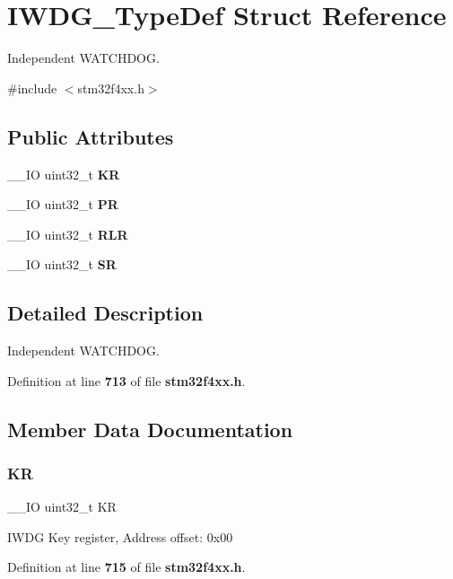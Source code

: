 \section{I\+W\+D\+G\+\_\+\+Type\+Def Struct Reference}
\label{structIWDG__TypeDef}


Independent W\+A\+T\+C\+H\+D\+OG.  




{\ttfamily \#include $<$stm32f4xx.\+h$>$}

\subsection*{Public Attributes}
\begin{DoxyCompactItemize}
\item 
\+\_\+\+\_\+\+IO uint32\+\_\+t \textbf{ KR}
\item 
\+\_\+\+\_\+\+IO uint32\+\_\+t \textbf{ PR}
\item 
\+\_\+\+\_\+\+IO uint32\+\_\+t \textbf{ R\+LR}
\item 
\+\_\+\+\_\+\+IO uint32\+\_\+t \textbf{ SR}
\end{DoxyCompactItemize}


\subsection{Detailed Description}
Independent W\+A\+T\+C\+H\+D\+OG. 

Definition at line \textbf{ 713} of file \textbf{ stm32f4xx.\+h}.



\subsection{Member Data Documentation}
\mbox{\label{structIWDG__TypeDef_a2f692354bde770f2a5e3e1b294ec064b}} 
\subsubsection{KR}
{\footnotesize\ttfamily \+\_\+\+\_\+\+IO uint32\+\_\+t KR}

I\+W\+DG Key register, Address offset\+: 0x00 

Definition at line \textbf{ 715} of file \textbf{ stm32f4xx.\+h}.

\mbox{\label{structIWDG__TypeDef_af8d25514079514d38c104402f46470af}} 
